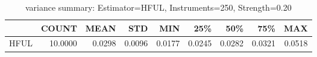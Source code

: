 \begin{table}[ht]
\centering
\caption{variance summary: Estimator=HFUL, Instruments=250, Strength=0.20}
\begin{tabular}{lrrrrrrrr}
\toprule
 & COUNT & MEAN & STD & MIN & 25\% & 50\% & 75\% & MAX \\
\midrule
HFUL & 10.0000 & 0.0298 & 0.0096 & 0.0177 & 0.0245 & 0.0282 & 0.0321 & 0.0518 \\
\bottomrule
\end{tabular}
\end{table}

